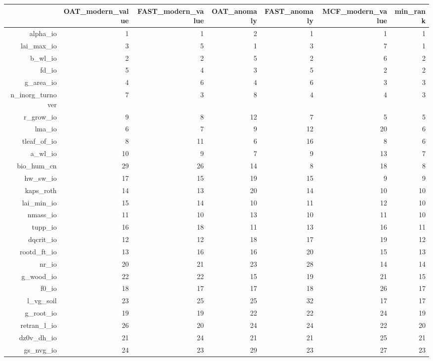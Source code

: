 \documentclass[gmd, manuscript]{copernicus}
\begin{document}
\begin{table}[ht]
\centering
\begin{tabular}{rrrrrrr}
  \hline
 & OAT\_modern\_value & FAST\_modern\_value & OAT\_anomaly & FAST\_anomaly & MCF\_modern\_value & min\_rank \\ 
  \hline
alpha\_io & 1 & 1 & 2 & 1 & 1 & 1 \\ 
  lai\_max\_io & 3 & 5 & 1 & 3 & 7 & 1 \\ 
  b\_wl\_io & 2 & 2 & 5 & 2 & 6 & 2 \\ 
  fd\_io & 5 & 4 & 3 & 5 & 2 & 2 \\ 
  g\_area\_io & 4 & 6 & 4 & 6 & 3 & 3 \\ 
  n\_inorg\_turnover & 7 & 3 & 8 & 4 & 4 & 3 \\ 
  r\_grow\_io & 9 & 8 & 12 & 7 & 5 & 5 \\ 
  lma\_io & 6 & 7 & 9 & 12 & 20 & 6 \\ 
  tleaf\_of\_io & 8 & 11 & 6 & 16 & 8 & 6 \\ 
  a\_wl\_io & 10 & 9 & 7 & 9 & 13 & 7 \\ 
  bio\_hum\_cn & 29 & 26 & 14 & 8 & 18 & 8 \\ 
  hw\_sw\_io & 17 & 15 & 19 & 15 & 9 & 9 \\ 
  kaps\_roth & 14 & 13 & 20 & 14 & 10 & 10 \\ 
  lai\_min\_io & 15 & 14 & 10 & 11 & 12 & 10 \\ 
  nmass\_io & 11 & 10 & 13 & 10 & 11 & 10 \\ 
  tupp\_io & 16 & 18 & 11 & 13 & 16 & 11 \\ 
  dqcrit\_io & 12 & 12 & 18 & 17 & 19 & 12 \\ 
  rootd\_ft\_io & 13 & 16 & 16 & 20 & 15 & 13 \\ 
  nr\_io & 20 & 21 & 23 & 28 & 14 & 14 \\ 
  g\_wood\_io & 22 & 22 & 15 & 19 & 21 & 15 \\ 
  f0\_io & 18 & 17 & 17 & 18 & 26 & 17 \\ 
  l\_vg\_soil & 23 & 25 & 25 & 32 & 17 & 17 \\ 
  g\_root\_io & 19 & 19 & 22 & 22 & 24 & 19 \\ 
  retran\_l\_io & 26 & 20 & 24 & 24 & 22 & 20 \\ 
  dz0v\_dh\_io & 21 & 24 & 21 & 21 & 25 & 21 \\ 
  gs\_nvg\_io & 24 & 23 & 29 & 23 & 27 & 23 \\ 

\end{tabular}
\end{table}
\end{document}
